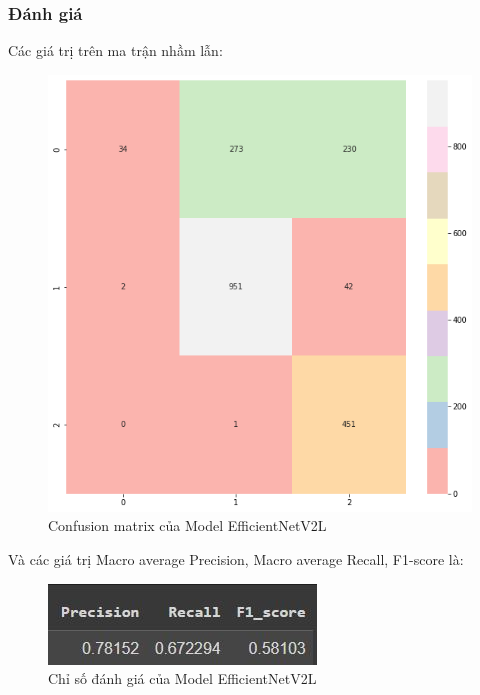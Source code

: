 \subsubsection{Đánh giá}
Các giá trị trên ma trận nhầm lẫn:
\begin{center}
    \begin{figure}[!h]
        \centering
        \includegraphics[scale = 0.38]{fileanh/Resnet1.png}
        \caption{Confusion matrix của Model EfficientNetV2L}
    \end{figure}
\end{center}
Và các giá trị Macro average Precision, Macro average Recall, F1-score là:
\begin{center}
    \begin{figure}[!h]
        \centering
        \includegraphics[scale = 1.2]{fileanh/Resnet2.jpg}
        \caption{Chỉ số đánh giá của Model EfficientNetV2L}
    \end{figure}
\end{center}




    